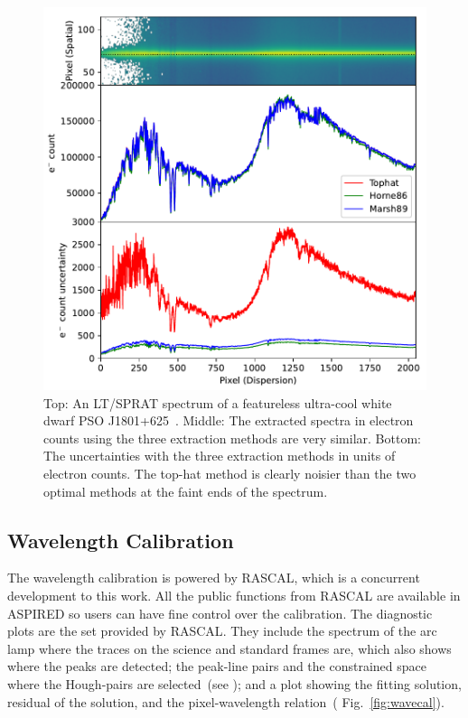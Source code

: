\documentclass[linenumbers, twocolumn]{aastex631}
\begin{document}
\begin{figure}
    \centering
    \includegraphics[width=\columnwidth]{fig_04_extraction_compared.pdf}
    \caption{Top: An LT/SPRAT spectrum of a featureless ultra-cool white dwarf PSO J1801+625~\citep{2020MNRAS.493.6001L}.
    Middle: The extracted spectra in electron counts using the three extraction methods
    are very similar. Bottom: The uncertainties with the three extraction methods
    in units of electron counts. The
    top-hat method is clearly noisier than the two optimal methods at the faint ends of the spectrum.}
    \label{fig:extraction_compared}
\end{figure}

\subsection{Wavelength Calibration}
The wavelength calibration is powered by \textsc{RASCAL}, which is a concurrent
development to this work. All the public functions from \textsc{RASCAL} are
available in \textsc{ASPIRED} so users can have fine control over the
calibration. The diagnostic plots are the set provided by \textsc{RASCAL}.
They include the spectrum of the arc lamp where the traces on the science and
standard frames are, which also shows where the peaks are detected; the
peak-line pairs and the constrained space where the Hough-pairs are
selected~(see \citealt{2020ASPC..527..627V}); and a plot showing the fitting
solution, residual of the solution, and the pixel-wavelength relation~(
Fig.~\ref{fig:wavecal}).
\end{document}
